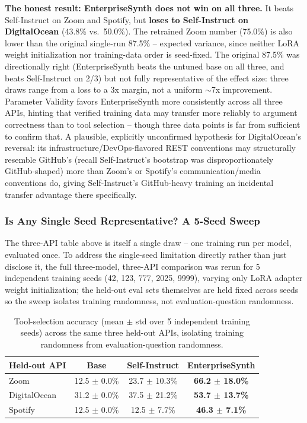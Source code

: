 \documentclass[11pt]{article}
\begin{document}
\textbf{The honest result: EnterpriseSynth does not win on all three.} It beats Self-Instruct on
Zoom and Spotify, but \textbf{loses to Self-Instruct on DigitalOcean} (43.8\% vs.\ 50.0\%). The
retrained Zoom number (75.0\%) is also lower than the original single-run 87.5\% -- expected
variance, since neither LoRA weight initialization nor training-data order is seed-fixed. The
original 87.5\% was directionally right (EnterpriseSynth beats the untuned base on all three, and
beats Self-Instruct on 2/3) but not fully representative of the effect size: three draws range
from a loss to a 3x margin, not a uniform $\sim$7x improvement. Parameter Validity favors
EnterpriseSynth more consistently across all three APIs, hinting that verified training data may
transfer more reliably to argument correctness than to tool selection -- though three data points
is far from sufficient to confirm that. A plausible, explicitly unconfirmed hypothesis for
DigitalOcean's reversal: its infrastructure/DevOps-flavored REST conventions may structurally
resemble GitHub's (recall Self-Instruct's bootstrap was disproportionately GitHub-shaped) more
than Zoom's or Spotify's communication/media conventions do, giving Self-Instruct's GitHub-heavy
training an incidental transfer advantage there specifically.

\subsubsection{Is Any Single Seed Representative? A 5-Seed Sweep}
The three-API table above is itself a single draw -- one training run per model, evaluated once.
To address the single-seed limitation directly rather than just disclose it, the full
three-model, three-API comparison was rerun for 5 independent training seeds (42, 123, 777, 2025, 9999),
varying only LoRA adapter weight initialization; the held-out eval sets themselves are held fixed
across seeds so the sweep isolates training randomness, not evaluation-question randomness.

\begin{table}[htbp]
\centering
\footnotesize
\setlength{\tabcolsep}{2pt}
\caption{Tool-selection accuracy (mean $\pm$ std over 5 independent training seeds) across the
same three held-out APIs, isolating training randomness from evaluation-question randomness.}
\label{tab:exp5-five-seed}
\begin{tabular}{lccc}
\toprule
\textbf{Held-out API} & \textbf{Base} & \textbf{Self-Instruct} & \textbf{EnterpriseSynth} \\
\midrule
Zoom & 12.5 $\pm$ 0.0\% & 23.7 $\pm$ 10.3\% & \textbf{66.2 $\pm$ 18.0\%} \\
DigitalOcean & 31.2 $\pm$ 0.0\% & 37.5 $\pm$ 21.2\% & \textbf{53.7 $\pm$ 13.7\%} \\
Spotify & 12.5 $\pm$ 0.0\% & 12.5 $\pm$ 7.7\% & \textbf{46.3 $\pm$ 7.1\%} \\
\bottomrule
\end{tabular}
\end{table}
\end{document}
